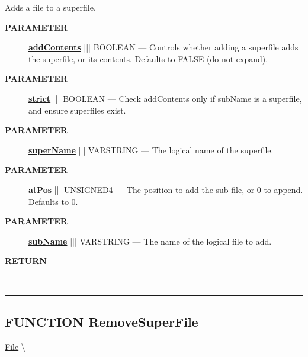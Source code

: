 \par





Adds a file to a superfile.






\par
\begin{description}
\item [\colorbox{tagtype}{\color{white} \textbf{\textsf{PARAMETER}}}] \textbf{\underline{addContents}} ||| BOOLEAN --- Controls whether adding a superfile adds the superfile, or its contents. Defaults to FALSE (do not expand).
\item [\colorbox{tagtype}{\color{white} \textbf{\textsf{PARAMETER}}}] \textbf{\underline{strict}} ||| BOOLEAN --- Check addContents only if subName is a superfile, and ensure superfiles exist.
\item [\colorbox{tagtype}{\color{white} \textbf{\textsf{PARAMETER}}}] \textbf{\underline{superName}} ||| VARSTRING --- The logical name of the superfile.
\item [\colorbox{tagtype}{\color{white} \textbf{\textsf{PARAMETER}}}] \textbf{\underline{atPos}} ||| UNSIGNED4 --- The position to add the sub-file, or 0 to append. Defaults to 0.
\item [\colorbox{tagtype}{\color{white} \textbf{\textsf{PARAMETER}}}] \textbf{\underline{subName}} ||| VARSTRING --- The name of the logical file to add.
\end{description}







\par
\begin{description}
\item [\colorbox{tagtype}{\color{white} \textbf{\textsf{RETURN}}}] \textbf{} --- 
\end{description}




\rule{\linewidth}{0.5pt}
\subsection*{\textsf{\colorbox{headtoc}{\color{white} FUNCTION}
RemoveSuperFile}}

\hypertarget{ecldoc:file.removesuperfile}{}
\hspace{0pt} \hyperlink{ecldoc:File}{File} \textbackslash 

